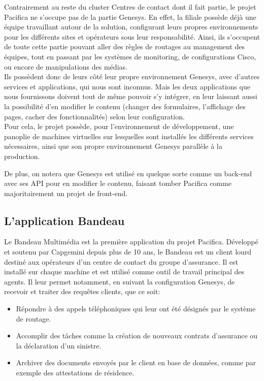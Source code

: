 \documentclass{rapport}
\begin{document}
Contrairement au reste du cluster Centres de contact dont il fait partie, le projet Pacifica ne s'occupe pas de la partie Genesys. En effet, la filiale possède déjà une équipe travaillant autour de la solution, configurant leurs propres environnements pour les différents sites et opérateurs sous leur responsabilité. Ainsi, ils s'occupent de toute cette partie pouvant aller des règles de routages au management des équipes, tout en passant par les systèmes de monitoring, de configurations Cisco, ou encore de manipulations des médias.\\

Ils possèdent donc de leurs côté leur propre environnement Genesys, avec d'autres services et applications, qui nous sont inconnus. Mais les deux applications que nous fournissons doivent tout de même pouvoir s'y intégrer, en leur laissant aussi la possibilité d'en modifier le contenu (changer des formulaires, l'affichage des pages, cacher des fonctionnalités) selon leur configuration.\\
Pour cela, le projet possède, pour l'environnement de développement, une panoplie de machines virtuelles sur lesquelles sont installés les différents services nécessaires, ainsi que son propre environnement Genesys parallèle à la production.

De plus, on notera que Genesys est utilisé en quelque sorte comme un back-end avec ses API pour en modifier le contenu, faisant tomber Pacifica comme majoritairement un projet de front-end.\\

\subsection{L'application Bandeau}

Le Bandeau Multimédia est la première application du projet Pacifica. Développé et soutenu par Capgemini depuis plus de 10 ans, le Bandeau est un client lourd destiné aux opérateurs d'un centre de contact du groupe d'assurance. Il est installé sur chaque machine et est utilisé comme outil de travail principal des agents. Il leur permet notamment, en suivant la configuration Genesys, de recevoir et traiter des requêtes clients, que ce soit:\\

\begin{itemize}
\item Répondre à des appels téléphoniques qui leur ont été désignés par le système de routage.
\item Accomplir des tâches comme la création de nouveaux contrats d'assurance ou la déclaration d'un sinistre.
\item Archiver des documents envoyés par le client en base de données, comme par exemple des attestations de résidence.
\end{itemize}
\end{document}
